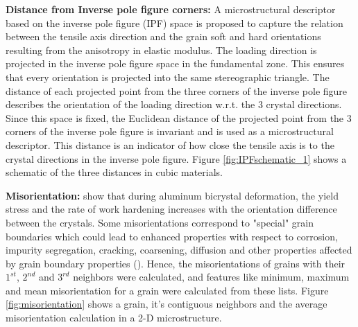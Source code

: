 \documentclass[preprint,1p,times,authoryear]{elsarticle}%
\begin{document}
\textbf{Distance from Inverse pole figure corners: }
A microstructural descriptor based on the inverse pole figure (IPF) space is proposed to capture the relation between the tensile axis direction and the grain soft and hard orientations resulting from the anisotropy in elastic modulus. The loading direction is projected in the inverse pole figure space in the fundamental zone. This ensures that every orientation is projected into the same stereographic triangle. The distance of each projected point from the three corners of the inverse pole figure describes the orientation of the loading direction w.r.t. the 3 crystal directions. Since this space is fixed, the Euclidean distance of the projected point from the 3 corners of the inverse pole figure is invariant and is used as a microstructural descriptor. This distance is an indicator of how close the tensile axis is to the crystal directions in the inverse pole figure. Figure \ref{fig:IPFschematic_1} shows a schematic of the three distances in cubic materials. 



\textbf{Misorientation: }
\cite{Aust1954} show that during aluminum bicrystal deformation, the yield stress and the rate of work hardening increases with the orientation difference between the crystals. Some misorientations correspond to "special" grain boundaries which could lead to enhanced properties with respect to corrosion, impurity segregation, cracking, coarsening, diffusion and other properties affected by grain boundary properties (\cite{Lehockey19983069}). Hence, the misorientations of grains with their $1^{st}$, $2^{nd}$ and $3^{rd}$ neighbors were calculated, and features like minimum, maximum and mean misorientation for a grain were calculated from these lists. Figure \ref{fig:misorientation} shows a grain, it's contiguous neighbors and the average misorientation calculation in a 2-D microstructure.
\end{document}
